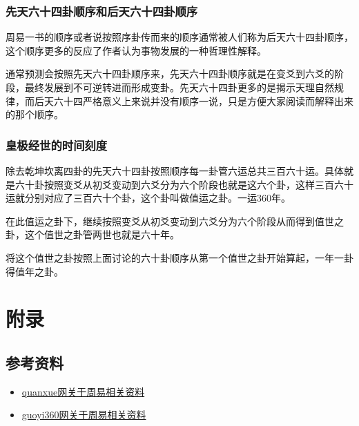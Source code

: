 \documentclass[12pt,oneside]{book}
\begin{document}
\section{先天六十四卦顺序和后天六十四卦顺序}
周易一书的顺序或者说按照序卦传而来的顺序通常被人们称为后天六十四卦顺序，这个顺序更多的反应了作者认为事物发展的一种哲理性解释。

通常预测会按照先天六十四卦顺序来，先天六十四卦顺序就是在变爻到六爻的阶段，最终发展到不可逆转进而形成变卦。先天六十四卦更多的是揭示天理自然规律，而后天六十四严格意义上来说并没有顺序一说，只是方便大家阅读而解释出来的那个顺序。

\section{皇极经世的时间刻度}
除去乾坤坎离四卦的先天六十四卦按照顺序每一卦管六运总共三百六十运。具体就是六十卦按照变爻从初爻变动到六爻分为六个阶段也就是这六个卦，这样三百六十运就分别对应了三百六十个卦，这个卦叫做值运之卦。一运360年。

在此值运之卦下，继续按照变爻从初爻变动到六爻分为六个阶段从而得到值世之卦，这个值世之卦管两世也就是六十年。

将这个值世之卦按照上面讨论的六十卦顺序从第一个值世之卦开始算起，一年一卦得值年之卦。



\part{附录}
\chapter{参考资料}
\begin{itemize}
\item \href{http://www.quanxue.cn/QT_MingXiang/Index.html}{quanxue网关于周易相关资料}
\item \href{http://www.guoyi360.com/zyqs/}{guoyi360网关于周易相关资料}

\end{itemize}








\end{document}
